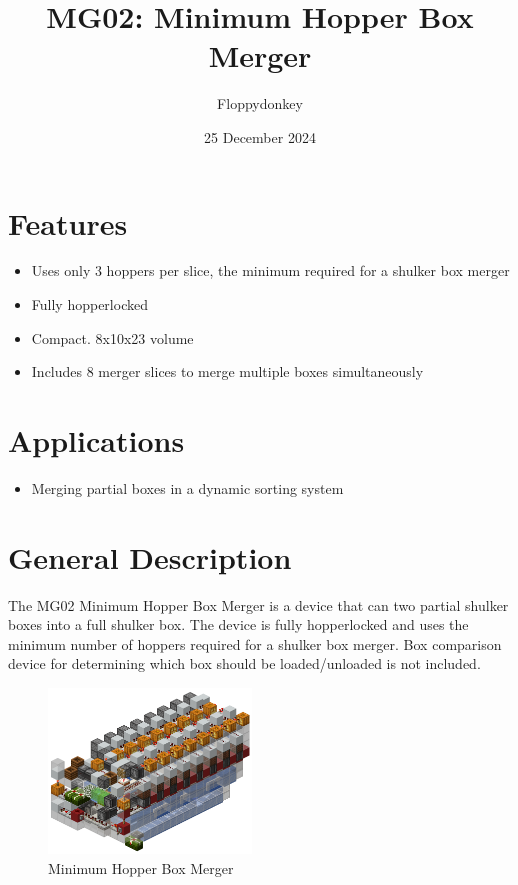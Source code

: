 \documentclass[10pt]{datasheet}
\title{MG02: Minimum Hopper Box Merger}
\author{Floppydonkey}
\date{25 December 2024}
\begin{document}
\maketitle

\section{Features}

\begin{itemize}
\item{Uses only 3 hoppers per slice, the minimum required for a shulker box merger}
\item{Fully hopperlocked}
\item{Compact. 8x10x23 volume}
\item{Includes 8 merger slices to merge multiple boxes simultaneously}
\end{itemize}

\section{Applications}

\begin{itemize}
\item{Merging partial boxes in a dynamic sorting system}
\end{itemize}

\section{General Description}
The MG02 Minimum Hopper Box Merger is a device that can two partial shulker boxes into a full shulker box. The device is fully hopperlocked and uses the minimum number of hoppers required for a shulker box merger. Box comparison device for determining which box should be loaded/unloaded is not included.

\vfill\break

\begin{figure}[H]
    \centering
    \includegraphics[width=0.48\textwidth]{area_render.png}
    \caption{\centering Minimum Hopper Box Merger}
\end{figure}
\end{document}
